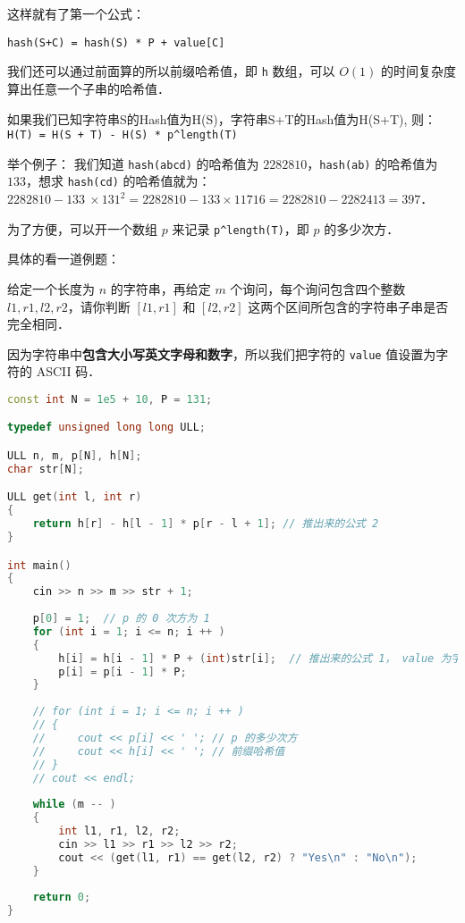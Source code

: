 这样就有了第一个公式：

\verb|hash(S+C) = hash(S) * P + value[C]|

我们还可以通过前面算的所以前缀哈希值，即 \verb|h| 数组，可以 $O(1)$ 的时间复杂度算出任意一个子串的哈希值．

如果我们已知字符串S的Hash值为H(S)，字符串S+T的Hash值为H(S+T),
则：\verb|H(T) = H(S + T) - H(S) * p^length(T)|

举个例子：
我们知道 \verb|hash(abcd)| 的哈希值为 $2282810$，\verb|hash(ab)| 的哈希值为 $133$，想求 \verb|hash(cd)| 的哈希值就为：
$2282810 - 133\  \times 131^2 = 2282810 - 133 \times 11716 = 2282810 - 2282413 = 397$．

为了方便，可以开一个数组 $p$ 来记录 \verb|p^length(T)|，即 $p$ 的多少次方．

具体的看一道例题：

给定一个长度为 $n$ 的字符串，再给定 $m$ 个询问，每个询问包含四个整数 $l1,r1,l2,r2$，请你判断 $[l1,r1]$ 和 $[l2,r2]$ 这两个区间所包含的字符串子串是否完全相同．

因为字符串中\textbf{包含大小写英文字母和数字}，所以我们把字符的 \verb|value| 值设置为字符的 ASCII 码．

\begin{lstlisting}[language=cpp]
const int N = 1e5 + 10, P = 131;

typedef unsigned long long ULL;

ULL n, m, p[N], h[N];
char str[N];

ULL get(int l, int r)
{
    return h[r] - h[l - 1] * p[r - l + 1]; // 推出来的公式 2
}

int main()
{
    cin >> n >> m >> str + 1;
    
    p[0] = 1;  // p 的 0 次方为 1
    for (int i = 1; i <= n; i ++ )
    {
        h[i] = h[i - 1] * P + (int)str[i];  // 推出来的公式 1， value 为字符的 ASCII
        p[i] = p[i - 1] * P;
    }
    
    // for (int i = 1; i <= n; i ++ )
    // {
    //     cout << p[i] << ' '; // p 的多少次方
    //     cout << h[i] << ' '; // 前缀哈希值
    // }
    // cout << endl;
    
    while (m -- )
    {
        int l1, r1, l2, r2;
        cin >> l1 >> r1 >> l2 >> r2;
        cout << (get(l1, r1) == get(l2, r2) ? "Yes\n" : "No\n");
    }
    
    return 0;
}

\end{lstlisting}